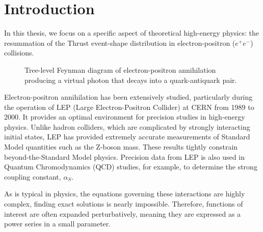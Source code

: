 \documentclass[../main.tex]{subfiles}
\begin{document}
\chapter{Introduction}\label{ch:introduction}

In this thesis, we focus on a specific aspect of theoretical high-energy physics: the resummation of the Thrust event-shape distribution in electron-positron ($e^+e^-$) collisions.

\begin{figure}[h!]
    \centering
    \caption{Tree-level Feynman diagram of electron-positron annihilation producing a virtual photon that decays into a quark-antiquark pair.}
    \label{fig:ep_annihilation}
\end{figure}


Electron-positron annihilation has been extensively studied, particularly during the operation of LEP (Large Electron-Positron Collider) at CERN from 1989 to 2000. 
It provides an optimal environment for precision studies in high-energy physics. 
Unlike hadron colliders, which are complicated by strongly interacting initial states, LEP has provided extremely accurate measurements of Standard Model quantities such as the Z-boson mass. 
These results tightly constrain beyond-the-Standard Model physics. Precision data from LEP is also used in Quantum Chromodynamics (QCD) studies, for example, to determine the strong coupling constant, $\alpha_S$.

As is typical in physics, the equations governing these interactions are highly complex, finding exact solutions is nearly impossible.
Therefore, functions of interest are often expanded perturbatively, meaning they are expressed as a power series in a small parameter.
\end{document}
